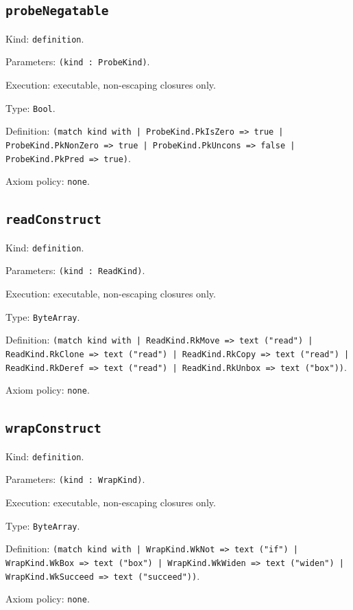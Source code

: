 \documentclass[11pt]{article}
\begin{document}
\subsection*{\texttt{probeNegatable}}
\noindent Kind: \texttt{definition}.\par
\noindent Parameters: \texttt{(kind : ProbeKind)}.\par
\noindent Execution: executable, non-escaping closures only.\par
\noindent Type: \texttt{Bool}.\par
\noindent Definition: \texttt{(match kind with | ProbeKind.PkIsZero => true | ProbeKind.PkNonZero => true | ProbeKind.PkUncons => false | ProbeKind.PkPred => true)}.\par
\noindent Axiom policy: \texttt{none}.\par
\subsection*{\texttt{readConstruct}}
\noindent Kind: \texttt{definition}.\par
\noindent Parameters: \texttt{(kind : ReadKind)}.\par
\noindent Execution: executable, non-escaping closures only.\par
\noindent Type: \texttt{ByteArray}.\par
\noindent Definition: \texttt{(match kind with | ReadKind.RkMove => text ("read") | ReadKind.RkClone => text ("read") | ReadKind.RkCopy => text ("read") | ReadKind.RkDeref => text ("read") | ReadKind.RkUnbox => text ("box"))}.\par
\noindent Axiom policy: \texttt{none}.\par
\subsection*{\texttt{wrapConstruct}}
\noindent Kind: \texttt{definition}.\par
\noindent Parameters: \texttt{(kind : WrapKind)}.\par
\noindent Execution: executable, non-escaping closures only.\par
\noindent Type: \texttt{ByteArray}.\par
\noindent Definition: \texttt{(match kind with | WrapKind.WkNot => text ("if") | WrapKind.WkBox => text ("box") | WrapKind.WkWiden => text ("widen") | WrapKind.WkSucceed => text ("succeed"))}.\par
\noindent Axiom policy: \texttt{none}.\par
\end{document}

